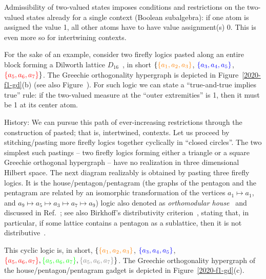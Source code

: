 Admissibility of two-valued states imposes conditions and restrictions on the two-valued states already for a single context (Boolean subalgebra):
if one atom is assigned the value 1, all other
atoms have to have value assignment(s) $0$.
This is even more so for intertwining contexts.

For the sake of an example, consider two firefly logics pasted along an entire block forming a Dilworth lattice  $D_{16}$~\cite{Kalmbach1990},
in short
$
\{
{\color{orange}\{a_1,a_2,a_3\}}
$, $
{\color{blue}\{a_3,a_4,a_5\}}
$, $
{\color{red}\{a_5,a_6,a_7\}}
\}
$.
The Greechie orthogonality hypergraph is depicted in Figure~\ref{2020-f1-gd}(b) (see also Figure~\cite[Figure~12.5]{svozil-2016-pu-book}).
For such logic we can state a ``true-and-true implies true'' rule:
if the two-valued measure at the ``outer extremities'' is 1, then it must be 1 at its center atom.


History:
We can pursue this path of ever-increasing restrictions through the construction of pasted; that is, intertwined, contexts.
Let us proceed by stitching/pasting more firefly logics together cyclically in ``closed circles''.
The two simplest such pastings
-- two firefly logics forming either a triangle or a square Greechie orthogonal hypergraph
-- have no realization in three dimensional Hilbert space.
The next diagram realizably is obtained by pasting three firefly logics.
It is the house/pentagon/pentagram
(the graphs of the pentagon and the pentagram are related by an isomorphic transformation of the vertices
$a_1 \mapsto a_1$, and
$a_9 \mapsto a_5 \mapsto a_3 \mapsto a_7 \mapsto a_9$)
logic also denoted as {\em orthomodular house}~\cite[p.~46, Figure~4.4]{kalmbach-83}
and discussed in Ref.~\cite{Beltrametti-1995};
see also Birkhoff's distributivity criterion~\cite[p.~90, Theorem~33]{beran},
stating that, in particular,  if some lattice contains a pentagon as a sublattice,
then it is not distributive~\cite{birkhoff_1934}.

This cyclic logic is, in short,
$
\{
{\color{orange}\{a_1,a_2,a_3\}}
$, $
{\color{blue}\{a_3,a_4,a_5\}}
$, $
{\color{red}\{a_5,a_6,a_7\}},
{\color{green}\{a_5,a_6,a_7\}},
{\color{gray}\{a_5,a_6,a_7\}}
\}
$.
The Greechie orthogonality hypergraph of the house/pentagon/pentagram gadget is depicted in Figure~\ref{2020-f1-gd}(c).

